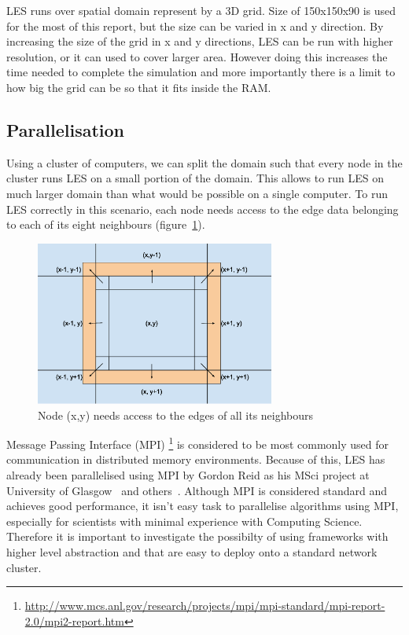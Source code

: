 \documentclass{l4proj}
\begin{document}
LES runs over spatial domain represent by a 3D grid. Size of 150x150x90 is used for the most
of this report, but the size can be varied in x and y direction. By increasing the size of the
grid in x and y directions, LES can be run with higher resolution, or it can used 
to cover larger area. However doing this increases the time needed to complete the simulation
and more importantly there is a limit to how big the grid can be so that it fits inside the RAM.

\subsection{Parallelisation}

Using a cluster of computers, we can split the domain such that every node in the cluster runs
LES on a small portion of the domain. This allows to run LES on much larger domain than what would be
possible on a single computer. To run LES correctly in this scenario, each node needs access to the 
edge data belonging to each of its eight neighbours (figure~\ref{fig:neighbours}).

\begin{figure}
\centering
\includegraphics[width=0.7\textwidth]{images/Neighbour_exchange.eps}
\caption{Node (x,y) needs access to the edges of all its neighbours}
\label{fig:neighbours}
\end{figure}

Message Passing Interface (MPI) \footnote{\url{http://www.mcs.anl.gov/research/projects/mpi/mpi-standard/mpi-report-2.0/mpi2-report.htm}} 
is considered to be most commonly used for communication in distributed memory environments.
Because of this, LES has already been parallelised using MPI by Gordon Reid as his MSci project at University of Glasgow~\cite{les_mpi} and others~\cite{les_palm}. Although MPI is considered standard and achieves good performance, it
isn't easy task to parallelise algorithms using MPI, especially for scientists with minimal
experience with Computing Science. Therefore it is important to investigate the possibilty
of using frameworks with higher level abstraction and that are easy to deploy onto a standard
network cluster.
\end{document}
